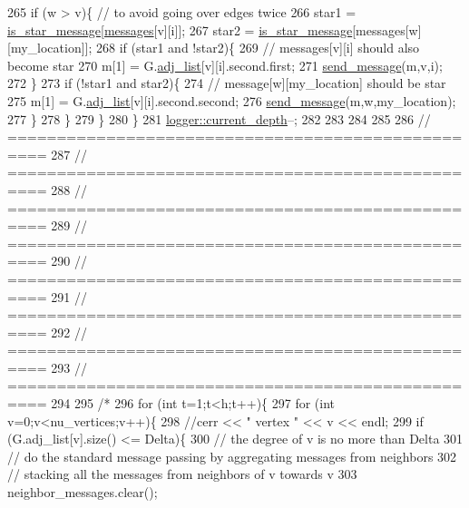 \begin{DoxyCode}
265       \textcolor{keywordflow}{if} (w > v)\{ \textcolor{comment}{// to avoid going over edges twice }
266         star1 = \hyperlink{classgraph__message_a55ff5531a0043106369e84a7bc45e22d}{is\_star\_message}[\hyperlink{classgraph__message_af680c8a1755cf8d4aba389c1a3d6634e}{messages}[v][i]];
267         star2 = \hyperlink{classgraph__message_a55ff5531a0043106369e84a7bc45e22d}{is\_star\_message}[messages[w][my\_location]];
268         \textcolor{keywordflow}{if} (star1 and !star2)\{
269           \textcolor{comment}{// messages[v][i] should also become star}
270           m[1] = G.\hyperlink{classmarked__graph_a1a0bf7ca413a278763f7c878b3b6fd6f}{adj\_list}[v][i].second.first;
271           \hyperlink{classgraph__message_aa76d1d5420a12477fa1dddd878d78c8f}{send\_message}(m,v,i);
272         \}
273         \textcolor{keywordflow}{if} (!star1 and star2)\{
274           \textcolor{comment}{// message[w][my\_location] should be star}
275           m[1] = G.\hyperlink{classmarked__graph_a1a0bf7ca413a278763f7c878b3b6fd6f}{adj\_list}[v][i].second.second;
276           \hyperlink{classgraph__message_aa76d1d5420a12477fa1dddd878d78c8f}{send\_message}(m,w,my\_location);
277         \}
278       \}
279     \}
280   \}
281   \hyperlink{classlogger_a9d29b49bd318a719a8e85b59eac54fe0}{logger::current\_depth}--;
282 
283 
284 
285 
286   \textcolor{comment}{// ==================================================}
287   \textcolor{comment}{// ==================================================}
288   \textcolor{comment}{// ==================================================}
289   \textcolor{comment}{// ==================================================}
290   \textcolor{comment}{// ==================================================}
291   \textcolor{comment}{// ==================================================}
292   \textcolor{comment}{// ==================================================}
293   \textcolor{comment}{// ==================================================}
294 
295   \textcolor{comment}{/*}
296 \textcolor{comment}{  for (int t=1;t<h;t++)\{}
297 \textcolor{comment}{    for (int v=0;v<nu\_vertices;v++)\{}
298 \textcolor{comment}{      //cerr << " vertex " << v << endl;}
299 \textcolor{comment}{      if (G.adj\_list[v].size() <= Delta)\{}
300 \textcolor{comment}{        // the degree of v is no more than Delta}
301 \textcolor{comment}{        // do the standard message passing by aggregating messages from neighbors}
302 \textcolor{comment}{        // stacking all the messages from neighbors of v towards v}
303 \textcolor{comment}{        neighbor\_messages.clear();}

\end{DoxyCode}
